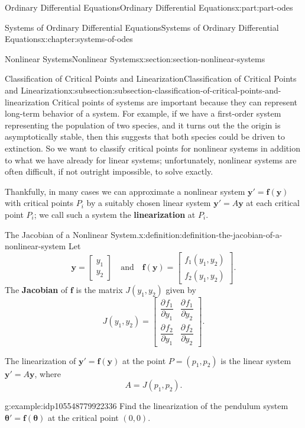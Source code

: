 \documentclass[oneside,10pt,]{book}
\newcommand{\terminology}[1]{\textbf{#1}}
\numberwithin{equation}{part}
\renewcommand{\vec}[1]{\mathbf{#1}}
\newcommand{\vecm}[1]{\bm{#1}}
\newcommand{\pdv}[3][]{\dfrac{\partial^{#1} #2}{\partial #3^{#1}}}
\renewcommand{\vecm}[1]{\boldsymbol{#1}}
\newcommand{\amp}{&}
\begin{document}
\begin{partptx}{Ordinary Differential Equations}{}{Ordinary Differential Equations}{}{}{x:part:part-odes}
\begin{chapterptx}{Systems of Ordinary Differential Equations}{}{Systems of Ordinary Differential Equations}{}{}{x:chapter:systems-of-odes}
\begin{sectionptx}{Nonlinear Systems}{}{Nonlinear Systems}{}{}{x:section:section-nonlinear-systems}
\begin{subsectionptx}{Classification of Critical Points and Linearization}{}{Classification of Critical Points and Linearization}{}{}{x:subsection:subsection-classification-of-critical-points-and-linearization}
Critical points of systems are important because they can represent long-term behavior of a system. For example, if we have a first-order system representing the population of two species, and it turns out the the origin is asymptotically stable, then this suggests that both species could be driven to extinction. So we want to classify critical points for nonlinear systems in addition to what we have already for linear systems; unfortunately, nonlinear systems are often difficult, if not outright impossible, to solve exactly.%
\par
Thankfully, in many cases we can approximate a nonlinear system \(\vec{y}' = \vec{f}(\vec{y})\) with critical points \(P_{i}\) by a suitably chosen linear system \(\vec{y}' = A\vec{y}\) at each critical point \(P_{i}\); we call such a system the \terminology{linearization} at \(P_{i}\).%
\begin{definition}{The Jacobian of a Nonlinear System.}{x:definition:definition-the-jacobian-of-a-nonlinear-system}%
Let%
\begin{equation*}
\vec{y} = \begin{bmatrix}y_{1} \\ y_{2}\end{bmatrix}\quad\text{and}\quad\vec{f}(\vec{y}) = \begin{bmatrix}f_{1}(y_{1},y_{2}) \\ f_{2}(y_{1},y_{2})\end{bmatrix}.
\end{equation*}
The \terminology{Jacobian} of \(\vec{f}\) is the matrix \(J(y_{1},y_{2})\) given by%
\begin{equation*}
J(y_{1},y_{2}) = \begin{bmatrix}\pdv{f_{1}}{y_{1}} \amp  \pdv{f_{1}}{y_{2}} \\ \pdv{f_{2}}{y_{1}} \amp  \pdv{f_{2}}{y_{2}}\end{bmatrix}.
\end{equation*}
%
\end{definition}
The linearization of \(\vec{y}' = \vec{f}(\vec{y})\) at the point \(P = (p_{1},p_{2})\) is the linear system \(\vec{y}' = A\vec{y}\), where%
\begin{equation*}
A = J(p_{1},p_{2}).
\end{equation*}
%
\begin{example}{}{g:example:idp105548779922336}%
Find the linearization of the pendulum system \(\vecm{\theta}' = \vec{f}(\vecm{\theta})\) at the critical point \((0,0)\).%
\par\smallskip%

\end{example}
\end{subsectionptx}
\end{sectionptx}
\end{chapterptx}
\end{partptx}
\end{document}
